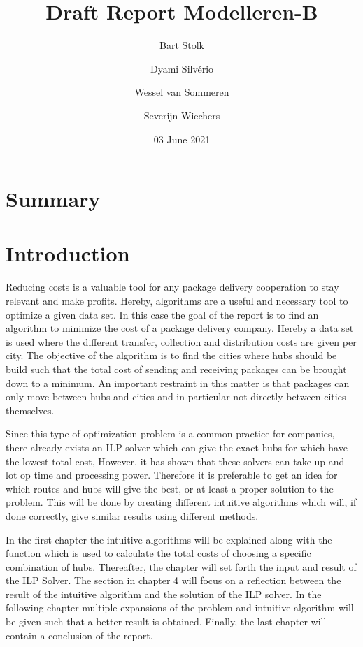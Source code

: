 \documentclass{article}
\title{Draft Report Modelleren-B}
\author{Bart Stolk \and Dyami Silvério \and Wessel van Sommeren \and Severijn Wiechers}
\date{03 June 2021}
\begin{document}
\maketitle

\newpage
\section*{Summary}



\newpage
\tableofcontents



\newpage
\section{Introduction}


Reducing costs is a valuable tool for any package delivery cooperation to stay relevant and make profits. Hereby, algorithms are a useful and necessary tool to optimize a given data set. In this case the goal of the report is to find an algorithm to minimize the cost of a package delivery company. Hereby a data set is used where the different transfer, collection and distribution costs are given per city. The objective of the algorithm is to find the cities where hubs should be build such that the total cost of sending and receiving packages can be brought down to a minimum. An important restraint in this matter is that packages can only move between hubs and cities and in particular not directly between cities themselves. 

Since this type of optimization problem is a common practice for companies, there already exists an ILP solver which can give the exact hubs for which have the lowest total cost, However, it has shown that these solvers can take up and lot op time and processing power. Therefore it is preferable to get an idea for which routes and hubs will give the best, or at least a proper solution to the problem. This will be done by creating different intuitive algorithms which will, if done correctly, give similar results using different methods.

In the first chapter the intuitive algorithms will be explained along with the function which is used to calculate the total costs of choosing a specific combination of hubs. Thereafter, the chapter will set forth the input and result of the ILP Solver. The section in chapter 4 will focus on a reflection between the result of the intuitive algorithm and the solution of the ILP solver. In the following chapter multiple expansions of the problem and intuitive algorithm will be given such that a better result is obtained. Finally, the last chapter will contain a conclusion of the report.
\end{document}
